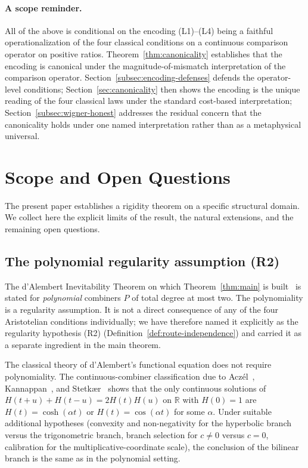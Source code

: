 \documentclass[11pt,a4paper]{article}
\theoremstyle{definition}
\theoremstyle{remark}
\begin{document}
\paragraph{A scope reminder.} All of the above is conditional on the
encoding (L1)--(L4) being a faithful operationalization of the four
classical conditions on a continuous comparison operator on positive
ratios. Theorem~\ref{thm:canonicality} establishes that the encoding
is canonical under the magnitude-of-mismatch interpretation of the
comparison operator. Section~\ref{subsec:encoding-defenses} defends
the operator-level conditions; Section~\ref{sec:canonicality} then
shows the encoding is the unique reading of the four classical laws
under the standard cost-based interpretation;
Section~\ref{subsec:wigner-honest} addresses the residual concern
that the canonicality holds under one named interpretation rather
than as a metaphysical universal.

\section{Scope and Open Questions}\label{sec:scope}

The present paper establishes a rigidity theorem on a specific structural
domain. We collect here the explicit limits of the result, the natural
extensions, and the remaining open questions.

\subsection{The polynomial regularity assumption (R2)}

The d'Alembert Inevitability Theorem on which Theorem~\ref{thm:main} is
built~\cite[Theorem~3]{WashburnZlatanovicAllahyarov2026} is stated for
\emph{polynomial} combiners $P$ of total degree at most two. The
polynomiality is a regularity assumption. It is not a direct consequence
of any of the four Aristotelian conditions individually; we have
therefore named it explicitly as the regularity hypothesis (R2)
(Definition~\ref{def:route-independence}) and carried it as a separate
ingredient in the main theorem.

The classical theory of d'Alembert's functional equation does not require
polynomiality. The continuous-combiner classification due to
Acz\'el~\cite{Aczel1966}, Kannappan~\cite{Kannappan2009}, and
Stetk{\ae}r~\cite{Stetkaer2013} shows that the only continuous solutions
of $H(t + u) + H(t - u) = 2H(t) H(u)$ on $\mathbb{R}$ with $H(0) = 1$ are
$H(t) = \cosh(\alpha t)$ or $H(t) = \cos(\alpha t)$ for some $\alpha$.
Under suitable additional hypotheses (convexity and non-negativity for the
hyperbolic branch versus the trigonometric branch, branch selection for
$c \neq 0$ versus $c = 0$, calibration for the multiplicative-coordinate
scale), the conclusion of the bilinear branch is the same as in the
polynomial setting.
\end{document}
